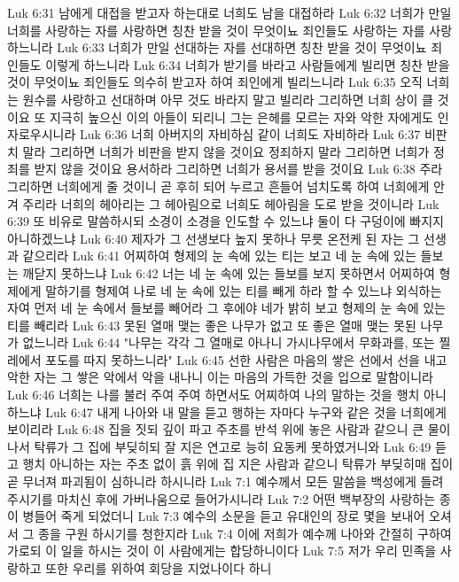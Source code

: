 Luk 6:31  남에게 대접을 받고자 하는대로 너희도 남을 대접하라
Luk 6:32  너희가 만일 너희를 사랑하는 자를 사랑하면 칭찬 받을 것이 무엇이뇨 죄인들도 사랑하는 자를 사랑하느니라
Luk 6:33  너희가 만일 선대하는 자를 선대하면 칭찬 받을 것이 무엇이뇨 죄인들도 이렇게 하느니라
Luk 6:34  너희가 받기를 바라고 사람들에게 빌리면 칭찬 받을 것이 무엇이뇨 죄인들도 의수히 받고자 하여 죄인에게 빌리느니라
Luk 6:35  오직 너희는 원수를 사랑하고 선대하며 아무 것도 바라지 말고 빌리라 그리하면 너희 상이 클 것이요 또 지극히 높으신 이의 아들이 되리니 그는 은헤를 모르는 자와 악한 자에게도 인자로우시니라
Luk 6:36  너희 아버지의 자비하심 같이 너희도 자비하라
Luk 6:37  비판치 말라 그리하면 너희가 비판을 받지 않을 것이요 정죄하지 말라 그리하면 너희가 정죄를 받지 않을 것이요 용서하라 그리하면 너희가 용서를 받을 것이요
Luk 6:38  주라 그리하면 너희에게 줄 것이니 곧 후히 되어 누르고 흔들어 넘치도록 하여 너희에게 안겨 주리라 너희의 헤아리는 그 헤아림으로 너희도 헤아림을 도로 받을 것이니라
Luk 6:39  또 비유로 말씀하시되 소경이 소경을 인도할 수 있느냐 둘이 다 구덩이에 빠지지 아니하겠느냐
Luk 6:40  제자가 그 선생보다 높지 못하나 무릇 온전케 된 자는 그 선생과 같으리라
Luk 6:41  어찌하여 형제의 눈 속에 있는 티는 보고 네 눈 속에 있는 들보는 깨닫지 못하느냐
Luk 6:42  너는 네 눈 속에 있는 들보를 보지 못하면서 어찌하여 형제에게 말하기를 형제여 나로 네 눈 속에 있는 티를 빼게 하라 할 수 있느냐 외식하는 자여 먼저 네 눈 속에서 들보를 빼어라 그 후에야 네가 밝히 보고 형제의 눈 속에 있는 티를 빼리라
Luk 6:43  못된 열매 맺는 좋은 나무가 없고 또 좋은 열매 맺는 못된 나무가 없느니라
Luk 6:44  "나무는 각각 그 열매로 아나니 가시나무에서 무화과를, 또는 찔레에서 포도를 따지 못하느니라"
Luk 6:45  선한 사람은 마음의 쌓은 선에서 선을 내고 악한 자는 그 쌓은 악에서 악을 내나니 이는 마음의 가득한 것을 입으로 말함이니라
Luk 6:46  너희는 나를 불러 주여 주여 하면서도 어찌하여 나의 말하는 것을 행치 아니하느냐
Luk 6:47  내게 나아와 내 말을 듣고 행하는 자마다 누구와 같은 것을 너희에게 보이리라
Luk 6:48  집을 짓되 깊이 파고 주초를 반석 위에 놓은 사람과 같으니 큰 물이 나서 탁류가 그 집에 부딪히되 잘 지은 연고로 능히 요동케 못하였거니와
Luk 6:49  듣고 행치 아니하는 자는 주초 없이 흙 위에 집 지은 사람과 같으니 탁류가 부딪히매 집이 곧 무너져 파괴됨이 심하니라 하시니라
Luk 7:1  예수께서 모든 말씀을 백성에게 들려 주시기를 마치신 후에 가버나움으로 들어가시니라
Luk 7:2  어떤 백부장의 사랑하는 종이 병들어 죽게 되었더니
Luk 7:3  예수의 소문을 듣고 유대인의 장로 몇을 보내어 오셔서 그 종을 구원 하시기를 청한지라
Luk 7:4  이에 저희가 예수께 나아와 간절히 구하여 가로되 이 일을 하시는 것이 이 사람에게는 합당하니이다
Luk 7:5  저가 우리 민족을 사랑하고 또한 우리를 위하여 회당을 지었나이다 하니
